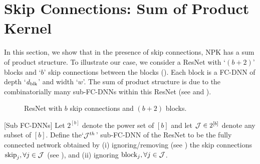 \section{Skip Connections: Sum of Product Kernel}\label{sec:res}
In this section, we show that in the presence of skip connections, NPK has a sum of product structure. To illustrate our case, we consider a ResNet with `$(b+2)$' blocks and `$b$' skip connections between the blocks (). Each block is a FC-DNN of depth `$d_{\text{blk}}$' and width `$w$'. The sum of product structure is due to the combinatorially many sub-FC-DNNs within this ResNet (see  and ).
\FloatBarrier
\begin{figure}[h]
\caption{\small{ResNet with $b$ skip connections and $(b+2)$ blocks.}}
\label{fig:resnet}
\end{figure}
\begin{definition}\label{def:subfcdnn}[Sub FC-DNNs]
Let $2^{[b]}$ denote the power set of $[b]$ and let $\mathcal{J}\in 2^{[b]}$ denote any subset of $[b]$. Define the`$\mathcal{J}^{th}$' sub-FC-DNN of the ResNet to be the fully connected network obtained by (i) ignoring/removing (see ) the skip connections $\text{skip}_j,\forall j\in \mathcal{J}$ (see ), and (ii) ignoring $\text{block}_{j},\forall j\in \mathcal{J}$.
\end{definition}
\FloatBarrier
